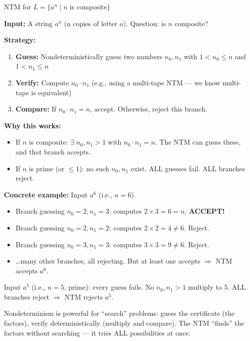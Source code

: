 \documentclass[11pt,a4paper]{article}
\newcommand{\kt}[1]{\par\vspace{0.3em}\colorbox{yellow!60}{\parbox{\dimexpr\linewidth-2\fboxsep}{#1}}\vspace{0.3em}}
\begin{document}
\begin{examplebox}{{NTM for $L = \{a^n \mid n$ is composite$\}$}}

\textbf{Input:} A string $a^n$ (n copies of letter $a$). Question: is $n$ composite?

\textbf{Strategy:}
\begin{enumerate}[nosep]
\item \textbf{Guess:} Nondeterministically guess two numbers $n_0, n_1$ with $1 < n_0 \leq n$ and $1 < n_1 \leq n$
\item \textbf{Verify:} Compute $n_0 \cdot n_1$ (e.g., using a multi-tape NTM --- we know multi-tape is equivalent)
\item \textbf{Compare:} If $n_0 \cdot n_1 = n$, accept. Otherwise, reject this branch.
\end{enumerate}

\textbf{Why this works:}
\begin{itemize}[nosep]
\item If $n$ is composite: $\exists\; n_0, n_1 > 1$ with $n_0 \cdot n_1 = n$. The NTM can guess these, and that branch accepts.
\item If $n$ is prime (or $\leq 1$): no such $n_0, n_1$ exist. ALL guesses fail. ALL branches reject.
\end{itemize}

\textbf{Concrete example:} Input $a^6$ (i.e., $n = 6$).
\begin{itemize}[nosep]
\item Branch guessing $n_0 = 2, n_1 = 3$: computes $2 \times 3 = 6 = n$. \textbf{ACCEPT!}
\item Branch guessing $n_0 = 2, n_1 = 2$: computes $2 \times 2 = 4 \neq 6$. Reject.
\item Branch guessing $n_0 = 3, n_1 = 3$: computes $3 \times 3 = 9 \neq 6$. Reject.
\item \ldots many other branches, all rejecting. But at least one accepts $\Rightarrow$ NTM accepts $a^6$.
\end{itemize}

Input $a^5$ (i.e., $n = 5$, prime): every guess fails. No $n_0, n_1 > 1$ multiply to 5. ALL branches reject $\Rightarrow$ NTM rejects $a^5$.

\kt{Nondeterminism is powerful for ``search'' problems: guess the certificate (the factors), verify deterministically (multiply and compare). The NTM ``finds'' the factors without searching --- it tries ALL possibilities at once.}
\end{examplebox}
\end{document}
